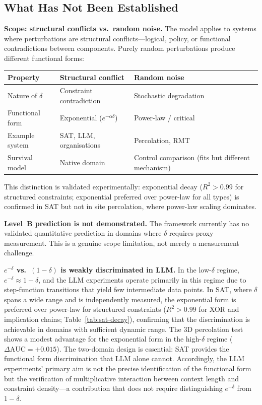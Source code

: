 \documentclass[11pt,a4paper]{article}
\begin{document}
\subsection{What Has Not Been Established}

\textbf{Scope: structural conflicts vs.\ random noise.} The model applies to systems where perturbations are structural conflicts---logical, policy, or functional contradictions between components. Purely random perturbations produce different functional forms:

\begin{center}
\small
\begin{tabular}{lll}
\toprule
\textbf{Property} & \textbf{Structural conflict} & \textbf{Random noise} \\
\midrule
Nature of $\delta$ & Constraint contradiction & Stochastic degradation \\
Functional form & Exponential ($e^{-\alpha\delta}$) & Power-law / critical \\
Example system & SAT, LLM, organisations & Percolation, RMT \\
Survival model & Native domain & Control comparison (fits but different mechanism) \\
\bottomrule
\end{tabular}
\end{center}

This distinction is validated experimentally: exponential decay ($R^2 > 0.99$ for structured constraints; exponential preferred over power-law for all types) is confirmed in SAT but not in site percolation, where power-law scaling dominates.

\textbf{Level~B prediction is not demonstrated.} The framework currently has no validated quantitative prediction in domains where $\delta$ requires proxy measurement. This is a genuine scope limitation, not merely a measurement challenge.

\textbf{$e^{-\delta}$ vs.\ $(1-\delta)$ is weakly discriminated in LLM.} In the low-$\delta$ regime, $e^{-\delta} \approx 1 - \delta$, and the LLM experiments operate primarily in this regime due to step-function transitions that yield few intermediate data points. In SAT, where $\delta$ spans a wide range and is independently measured, the exponential form is preferred over power-law for structured constraints ($R^2 > 0.99$ for XOR and implication chains; Table~\ref{tab:sat-decay}), confirming that the discrimination is achievable in domains with sufficient dynamic range. The 3D percolation test shows a modest advantage for the exponential form in the high-$\delta$ regime ($\Delta\text{AUC} = +0.015$). The two-domain design is essential: SAT provides the functional form discrimination that LLM alone cannot. Accordingly, the LLM experiments' primary aim is not the precise identification of the functional form but the verification of multiplicative interaction between context length and constraint density---a contribution that does not require distinguishing $e^{-\delta}$ from $1-\delta$.
\end{document}
